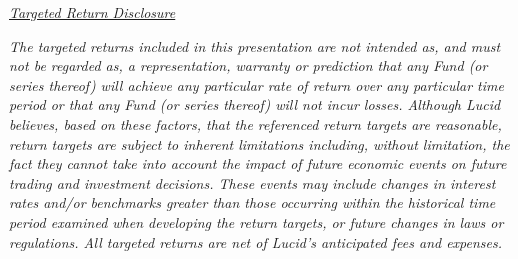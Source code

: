 \documentclass[9pt]{article}
\begin{document}
    \noindent\underline{\textit{Targeted Return Disclosure}}

    \noindent\textit{The targeted returns included in this presentation are not intended as, and must not be regarded as, a representation, warranty or prediction that any Fund (or series thereof) will achieve any particular rate of return over any particular time period or that any Fund (or series thereof) will not incur losses. Although Lucid believes, based on these factors, that the referenced return targets are reasonable, return targets are subject to inherent limitations including, without limitation, the fact they cannot take into account the impact of future economic events on future trading and investment decisions. These events may include changes in interest rates and/or benchmarks greater than those occurring within the historical time period examined when developing the return targets, or future changes in laws or regulations. All targeted returns are net of Lucid's anticipated fees and expenses.}
\end{document}
